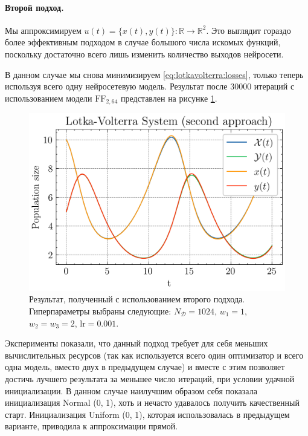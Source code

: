 \documentclass[a4paper, 12pt]{article}
\begin{document}
\paragraph{Второй подход.} Мы аппроксимируем $u(t) = \{x(t), y(t)\} : \mathbb{R} \to \mathbb{R}^2$. Это выглядит гораздо более эффективным подходом в случае большого числа искомых функций, поскольку достаточно всего лишь изменить количество выходов нейросети.

В данном случае мы снова минимизируем \ref{eq:lotkavolterra:losses}, только теперь используя всего одну нейросетевую модель. Результат после 30000 итераций с использованием модели $\mathrm{FF}_{2, 64}$ представлен на рисунке \ref{fig:lotkavolterra:second:solution}.

\begin{figure}
    \centering
    \includegraphics{../images/lotkavolterra/second approach/Lotka-Volterra System (second approach).png}
    \caption{Результат, полученный с использованием второго подхода. Гиперпараметры выбраны следующие: $N_\mathcal{D} = 1024$, $w_1 = 1$, $w_2 = w_3 = 2$, $\mathrm{lr} = 0.001$.}
    \label{fig:lotkavolterra:second:solution}
\end{figure}

Эксперименты показали, что данный подход требует для себя меньших вычислительных ресурсов (так как используется всего один оптимизатор и всего одна модель, вместо двух в предыдущем случае) и вместе с этим позволяет достичь лучшего результата за меньшее число итераций, при условии удачной инициализации. В данном случае наилучшим образом себя показала инициализация Normal (0, 1), хоть и нечасто удавалось получить качественный старт. Инициализация Uniform (0, 1), которая использовалась в предыдущем варианте, приводила к аппроксимации прямой.
\end{document}
